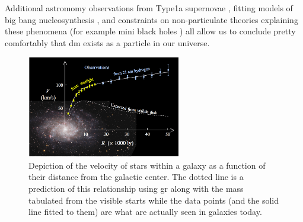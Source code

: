 Additional astromomy observations from Type1a supernovae \cite{type1a-supernova-2010}, fitting
models of big bang nucleosynthesis \cite{nucleosynthesis-1998}, and constraints on non-particulate
theories explaining these phenomena (for example mini black holes
\cite{constraints-primordial-black-holes-2021}) all allow us to conclude pretty comfortably that
\ac{dm} exists as a particle in our universe.

\begin{figure}
  \centering
  \includegraphics[width=0.6\textwidth]{figures/theory/rotation-curve-evidence-for-dm.png}
  \caption{
    Depiction of the velocity of stars within a galaxy as a function of their distance
    from the galactic center. The dotted line is a prediction of this relationship using
    \ac{gr} along with the mass tabulated from the visible starts while the data points
    (and the solid line fitted to them) are what are actually seen in galaxies today.
  }
  \label{fig:rotation-curve}
\end{figure}

